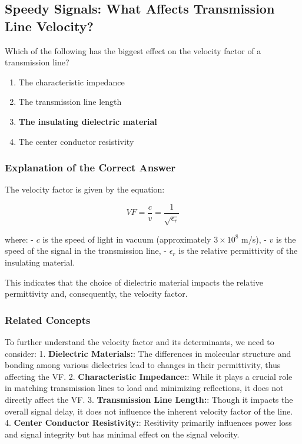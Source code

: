 \subsection{Speedy Signals: What Affects Transmission Line Velocity?}

\begin{tcolorbox}[colback=gray!10, colframe=black, title=E9F02]
Which of the following has the biggest effect on the velocity factor of a transmission line?
\begin{enumerate}[label=\Alph*.]
    \item The characteristic impedance
    \item The transmission line length
    \item \textbf{The insulating dielectric material}
    \item The center conductor resistivity
\end{enumerate} \end{tcolorbox}

\subsubsection{Explanation of the Correct Answer}


The velocity factor is given by the equation:

\[
VF = \frac{c}{v} = \frac{1}{\sqrt{\epsilon_r}}
\]

where:
- \( c \) is the speed of light in vacuum (approximately \( 3 \times 10^8 \) m/s),
- \( v \) is the speed of the signal in the transmission line,
- \( \epsilon_r \) is the relative permittivity of the insulating material.

This indicates that the choice of dielectric material impacts the relative permittivity and, consequently, the velocity factor.

\subsubsection{Related Concepts}
To further understand the velocity factor and its determinants, we need to consider:
1. \textbf{Dielectric Materials:}: The differences in molecular structure and bonding among various dielectrics lead to changes in their permittivity, thus affecting the VF.
2. \textbf{Characteristic Impedance:}: While it plays a crucial role in matching transmission lines to load and minimizing reflections, it does not directly affect the VF.
3. \textbf{Transmission Line Length:}: Though it impacts the overall signal delay, it does not influence the inherent velocity factor of the line.
4. \textbf{Center Conductor Resistivity:}: Resitivity primarily influences power loss and signal integrity but has minimal effect on the signal velocity.

